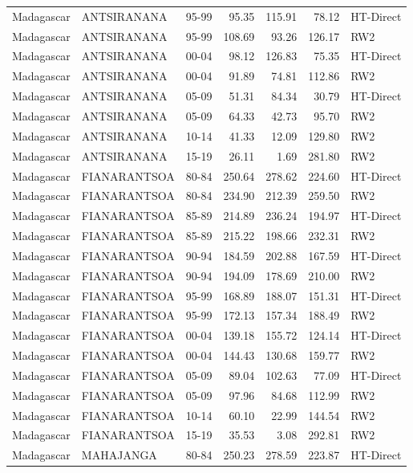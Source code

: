\begin{longtable}{lllrrrl}
  Madagascar & ANTSIRANANA & 95-99 & 95.35 & 115.91 & 78.12 & HT-Direct \\ 
  Madagascar & ANTSIRANANA & 95-99 & 108.69 & 93.26 & 126.17 & RW2 \\ 
  Madagascar & ANTSIRANANA & 00-04 & 98.12 & 126.83 & 75.35 & HT-Direct \\ 
  Madagascar & ANTSIRANANA & 00-04 & 91.89 & 74.81 & 112.86 & RW2 \\ 
  Madagascar & ANTSIRANANA & 05-09 & 51.31 & 84.34 & 30.79 & HT-Direct \\ 
  Madagascar & ANTSIRANANA & 05-09 & 64.33 & 42.73 & 95.70 & RW2 \\ 
  Madagascar & ANTSIRANANA & 10-14 & 41.33 & 12.09 & 129.80 & RW2 \\ 
  Madagascar & ANTSIRANANA & 15-19 & 26.11 & 1.69 & 281.80 & RW2 \\ 
  Madagascar & FIANARANTSOA & 80-84 & 250.64 & 278.62 & 224.60 & HT-Direct \\ 
  Madagascar & FIANARANTSOA & 80-84 & 234.90 & 212.39 & 259.50 & RW2 \\ 
  Madagascar & FIANARANTSOA & 85-89 & 214.89 & 236.24 & 194.97 & HT-Direct \\ 
  Madagascar & FIANARANTSOA & 85-89 & 215.22 & 198.66 & 232.31 & RW2 \\ 
  Madagascar & FIANARANTSOA & 90-94 & 184.59 & 202.88 & 167.59 & HT-Direct \\ 
  Madagascar & FIANARANTSOA & 90-94 & 194.09 & 178.69 & 210.00 & RW2 \\ 
  Madagascar & FIANARANTSOA & 95-99 & 168.89 & 188.07 & 151.31 & HT-Direct \\ 
  Madagascar & FIANARANTSOA & 95-99 & 172.13 & 157.34 & 188.49 & RW2 \\ 
  Madagascar & FIANARANTSOA & 00-04 & 139.18 & 155.72 & 124.14 & HT-Direct \\ 
  Madagascar & FIANARANTSOA & 00-04 & 144.43 & 130.68 & 159.77 & RW2 \\ 
  Madagascar & FIANARANTSOA & 05-09 & 89.04 & 102.63 & 77.09 & HT-Direct \\ 
  Madagascar & FIANARANTSOA & 05-09 & 97.96 & 84.68 & 112.99 & RW2 \\ 
  Madagascar & FIANARANTSOA & 10-14 & 60.10 & 22.99 & 144.54 & RW2 \\ 
  Madagascar & FIANARANTSOA & 15-19 & 35.53 & 3.08 & 292.81 & RW2 \\ 
  Madagascar & MAHAJANGA & 80-84 & 250.23 & 278.59 & 223.87 & HT-Direct \\ 

\end{longtable}
